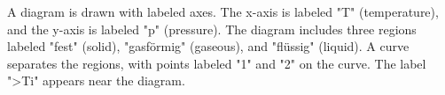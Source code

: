A diagram is drawn with labeled axes. The x-axis is labeled "T" (temperature), and the y-axis is labeled "p" (pressure). The diagram includes three regions labeled "fest" (solid), "gasförmig" (gaseous), and "flüssig" (liquid). A curve separates the regions, with points labeled "1" and "2" on the curve. The label ">Ti" appears near the diagram.